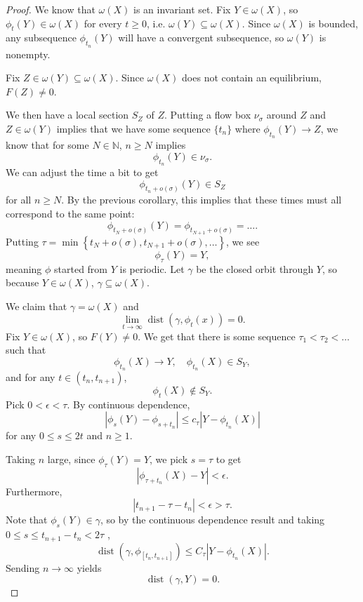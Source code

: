 \documentclass{tufte-handout}
\newcommand*\N{\mathbb{N}}
\theoremstyle{definition}
\begin{document}
\begin{proof}
	We know that $\omega(X)$ is an invariant set. Fix $Y \in \omega(X)$, so $\phi_t(Y) \in \omega(X)$ for every $t \ge 0$, i.e. $\omega(Y) \subseteq \omega(X)$. Since $\omega(X)$ is bounded, any subsequence $\phi_{t_n}(Y)$ will have a convergent subsequence, so $\omega(Y)$ is nonempty.

	Fix $Z \in \omega(Y) \subseteq \omega(X)$. Since $\omega(X)$ does not contain an equilibrium, $F(Z) \ne 0$.

	We then have a local section $S_Z$ of $Z$. Putting a flow box $\nu_\sigma$ around $Z$ and $Z \in \omega(Y)$ implies that we have some sequence $\{t_n\}$ where $\phi_{t_n} (Y) \to Z$, we know that for some $N \in \N$, $n \ge N$ implies \[
		\phi_{t_n} (Y) \in \nu_\sigma
	.\] We can adjust the time a bit to get \[
		\phi_{t_n + o(\sigma)}(Y) \in S_Z
	\] for all $n \ge N$. By the previous corollary, this implies that these times must all correspond to the same point: \[
		\phi_{t_N + o(\sigma)}(Y) = \phi_{t_{N+1} + o(\sigma)} = \ldots
	.\] Putting $\tau = \min \left\{ t_N + o(\sigma), t_{N+1} + o(\sigma), \ldots \right\}$, we see \[
		\phi_\tau(Y) = Y
	,\] meaning $\phi$ started from $Y$ is periodic. Let $\gamma$ be the closed orbit through $Y$, so because $Y \in \omega(X)$, $\gamma \subseteq \omega(X)$.

	We claim that $\gamma = \omega(X)$ and \[
		\lim\limits_{t \to \infty} \operatorname{dist}\left( \gamma, \phi_t(x) \right) = 0
	.\] Fix $Y \in \omega(X)$, so $F(Y) \ne 0$. We get that there is some sequence $\tau_1 < \tau_2< \ldots$ such that \[
		\phi_{t_n}(X) \to Y, \quad \phi_{t_n}(X) \in S_Y
	,\] and for any $t \in (t_n, t_{n+1})$, \[
		\phi_t(X) \not\in S_Y
	.\] Pick $0 < \epsilon < \tau$. By continuous dependence, \[
		\left| \phi_s(Y) - \phi_{s + t_n} \right| \le c_\tau \left| Y - \phi_{t_n}(X) \right|
	\] for any $0 \le s \le 2t$ and $n \ge 1$.

	Taking $n$ large, since $\phi_\tau(Y) = Y$, we pick $s = \tau$ to get \[
		\left| \phi_{\tau + t_n}(X) - Y \right| < \epsilon
	.\] Furthermore, \[
		\left| t_{n+1} - \tau - t_n \right| < \epsilon > \tau
		.\] Note that $\phi_s(Y) \in \gamma$, so by the continuous dependence result and taking $0 \le s \le t_{n+1} - t_n  <2\tau$
, \[
		\operatorname{dist}\left( \gamma, \phi_{\left[ t_n, t_{n+1} \right]} \right) \le C_\tau \left| Y - \phi_{t_n}(X) \right|
	.\] Sending $n \to \infty$ yields \[
		\operatorname{dist}\left( \gamma, Y \right) = 0
	.\] 
\end{proof}
\end{document}
